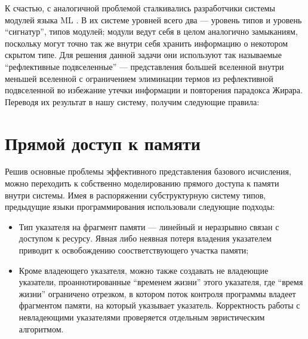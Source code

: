 \documentclass[12pt]{article}
\DeclareMathOperator{\inn}{in}
\DeclareMathOperator{\lett}{let}
\DeclareMathOperator{\type}{type}
\newcommand{\letin}[3]{\lett\,#1=#2\,\inn\,#3}
\begin{document}
К счастью, с аналогичной проблемой сталкивались разработчики системы модулей
языка ML \cite{reflect}. В их системе уровней всего два --- уровень типов и
уровень ``сигнатур'', типов модулей; модули ведут себя в целом аналогично
замыканиям, поскольку могут точно так же внутри себя хранить информацию о
некотором скрытом типе. Для решения данной задачи они используют так называемые
``рефлективные подвселенные'' --- представления большей вселенной внутри меньшей
вселенной с ограничением элиминации термов из рефлективной подвселенной во
избежание утечки информации и повторения парадокса Жирара. Переводя их результат
в нашу систему, получим следующие правила:


\section{Прямой доступ к памяти}

Решив основные проблемы эффективного представления базового исчисления, можно
переходить к собственно моделированию прямого доступа к памяти внутри системы.
Имея в распоряжении субструктурную систему типов, предыдущие языки
программирования использовали следующие подходы:

\begin{itemize}
  \item Тип указателя на фрагмент памяти --- линейный и неразрывно связан с
    доступом к ресурсу. Явная либо неявная потеря владения указателем приводит к
    освобождению соостветствующего участка памяти;
  \item Кроме владеющего указателя, можно также создавать не владеющие
    указатели, проаннотированные ``временем жизни'' этого указателя, где
    ``время жизни'' ограничено отрезком, в котором поток контроля программы
    владеет фрагментом памяти, на который указывает указатель. Корректность
    работы с невладеющими указателями проверяется отдельным эвристическим
    алгоритмом.
\end{itemize}
\end{document}
